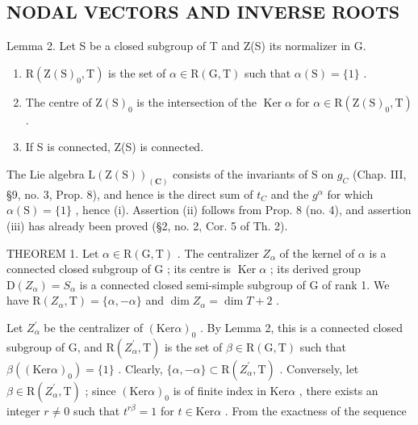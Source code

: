 \subsection{NODAL VECTORS AND INVERSE ROOTS}

Lemma 2. Let S be a closed subgroup of T and Z(S) its normalizer in G.

\begin{enumerate}
\def\labelenumi{(\roman{enumi})}
\item
  \(\mathrm{R}(\mathrm{Z}(\mathrm{S})_0,\mathrm{T})\) is the set of \(\alpha \in \mathrm{R}(\mathrm{G},\mathrm{T})\) such that \(\alpha (\mathrm{S}) = \{1\}\) .
\item
  The centre of \(\mathrm{Z(S)_0}\) is the intersection of the \(\operatorname {Ker}\alpha\) for \(\alpha \in \mathrm{R}(\mathrm{Z(S)}_0,\mathrm{T})\) .
\item
  If S is connected, Z(S) is connected.
\end{enumerate}

The Lie algebra \(\mathrm{L}(\mathrm{Z}(\mathrm{S}))_{(\mathbf{C})}\) consists of the invariants of S on \(g_{C}\) (Chap. III, §9, no. 3, Prop. 8), and hence is the direct sum of \(t_{C}\) and the \(g^{\alpha}\) for which \(\alpha(\mathrm{S})=\{1\}\) , hence (i). Assertion (ii) follows from Prop. 8 (no. 4), and assertion (iii) has already been proved (§2, no. 2, Cor. 5 of Th. 2).

THEOREM 1. Let \(\alpha \in \mathrm{R}(\mathrm{G},\mathrm{T})\) . The centralizer \(Z_{\alpha}\) of the kernel of \(\alpha\) is a connected closed subgroup of \(\mathrm{G}\) ; its centre is \(\operatorname{Ker} \alpha\) ; its derived group \(\mathrm{D}(Z_{\alpha}) = S_{\alpha}\) is a connected closed semi-simple subgroup of \(\mathrm{G}\) of rank 1. We have \(\mathrm{R}(Z_{\alpha},\mathrm{T}) = \{\alpha, -\alpha\}\) and \(\dim Z_{\alpha} = \dim T + 2\) .

Let \(Z_{\alpha}^{\prime}\) be the centralizer of \((\mathrm{Ker}\alpha)_0\) . By Lemma 2, this is a connected closed subgroup of G, and \(\mathrm{R}(Z_{\alpha}^{\prime},\mathrm{T})\) is the set of \(\beta \in \mathrm{R}(\mathrm{G},\mathrm{T})\) such that \(\beta ((\mathrm{Ker}\alpha)_0) = \{1\}\) . Clearly, \(\{\alpha , - \alpha \} \subset \mathrm{R}(Z_{\alpha}^{\prime},\mathrm{T})\) . Conversely, let \(\beta \in \mathrm{R}(Z_{\alpha}^{\prime},\mathrm{T})\) ; since \((\mathrm{Ker}\alpha)_0\) is of finite index in \(\mathrm{Ker}\alpha\) , there exists an integer \(r\neq 0\) such that \(t^{r\beta} = 1\) for \(t\in \mathrm{Ker}\alpha\) . From the exactness of the sequence


